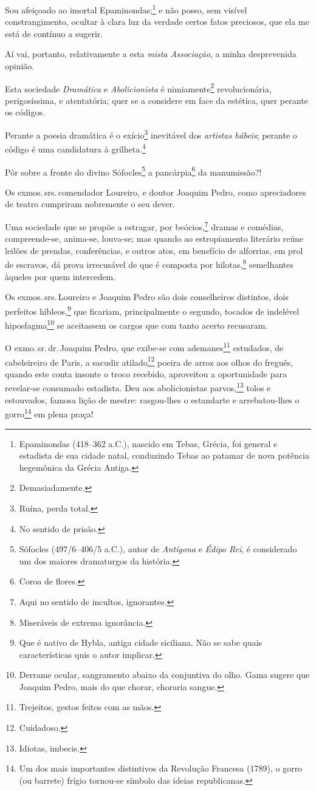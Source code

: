 Sou afeiçoado ao imortal Epaminondas;\footnote{Epaminondas (418--362 a.C.), nascido em Tebas, Grécia, foi general e estadista de \label{epaminondas} 
  sua cidade natal, conduzindo Tebas ao patamar de nova
  potência hegemônica da Grécia Antiga.} e não posso, sem visível
constrangimento, ocultar à clara luz da verdade certos fatos preciosos,
que ela me está de contínuo a sugerir.

Aí vai, portanto, relativamente a esta \emph{mista Associação}, a minha
desprevenida opinião.

Esta sociedade \emph{Dramática} e \emph{Abolicionista} é
nimiamente\footnote{Demasiadamente.} revolucionária, perigosíssima, e
atentatória; quer se a considere em face da estética, quer perante os
códigos.

Perante a poesia dramática é o exício\footnote{Ruína, perda total.}
inevitável dos \emph{artistas hábeis}; perante o código é uma
candidatura à grilheta.\footnote{No sentido de prisão.}

Pôr sobre a fronte do divino Sófocles\footnote{Sófocles (497/6--406/5 a.C.), autor de \emph{Antígona} e \emph{Édipo Rei}, é
  considerado um dos maiores dramaturgos da história.} a
pancárpia\footnote{Coroa de flores.} da manumissão?!

Os exmos.\,srs.\,comendador Loureiro, e doutor Joaquim Pedro, como
apreciadores de teatro cumpriram nobremente o seu dever.

Uma sociedade que se propõe a estragar, por beócios,\footnote{Aqui no
  sentido de incultos, ignorantes.} dramas e comédias, compreende-se,
anima-se, louva-se; mas quando ao estropiamento literário reúne leilões
de prendas, conferências, e outros atos, em benefício de alforrias, em
prol de escravos, dá prova irrecusável de que é composta por
hilotas,\footnote{Miseráveis de extrema ignorância.} semelhantes
àqueles por quem intercedem.

Os exmos.\,srs.\,Loureiro e Joaquim Pedro são dois conselheiros distintos,
dois perfeitos híbleos,\footnote{Que é nativo de Hybla, antiga cidade
  siciliana. Não se sabe quais características quis o autor implicar.}
que ficariam, principalmente o segundo, tocados de indelével
hiposfagma\footnote{Derrame ocular, sangramento abaixo da conjuntiva
  do olho. Gama sugere que Joaquim Pedro, mais do que chorar, choraria
  sangue.} se aceitassem os cargos que com tanto acerto recusaram.

O exmo.\,sr.\,dr.\,Joaquim Pedro, que exibe-se com ademanes\footnote{
  Trejeitos, gestos feitos com as mãos.} estudados, de cabeleireiro de
Paris, a sacudir atilado\footnote{Cuidadoso.} poeira de arroz aos
olhos do freguês, quando este conta insonte o troco recebido, aproveitou
a oportunidade para revelar-se consumado estadista. Deu aos
abolicionistas parvos,\footnote{Idiotas, imbecis.} tolos e estouvados,
famosa lição de mestre: rasgou-lhes o estandarte e arrebatou-lhes o
gorro\footnote{Um dos mais importantes distintivos da Revolução
  Francesa (1789), o gorro (ou barrete) frígio tornou-se símbolo das
  ideias republicanas.} em plena praça!

